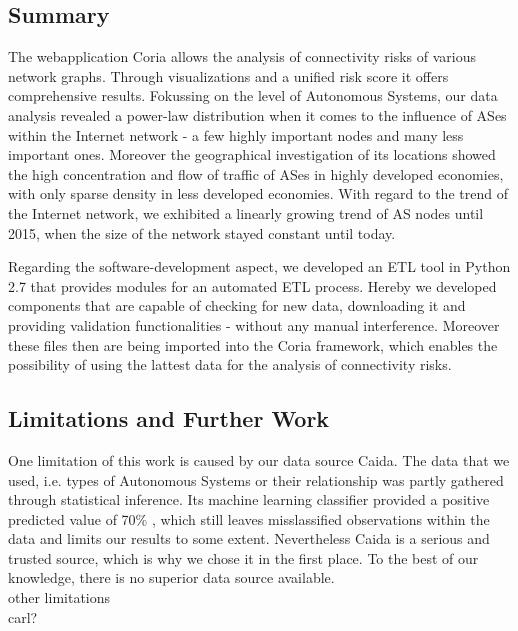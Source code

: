 \documentclass[conference, 11pt]{IEEEtran}
\begin{document}
\subsection{Summary}

The webapplication Coria allows the analysis of connectivity risks of various network graphs. Through visualizations and a unified risk score it offers comprehensive results. Fokussing on the level of Autonomous Systems, our data analysis revealed a power-law distribution when it comes to the influence of ASes within the Internet network - a few highly important nodes and many less important ones. Moreover the geographical investigation of its locations showed the high concentration and flow of traffic of ASes in highly developed economies, with only sparse density in less developed economies. With regard to the trend of the Internet network, we exhibited a linearly growing trend of AS nodes until 2015, when the size of the network stayed constant until today.

Regarding the software-development aspect, we developed an ETL tool in Python 2.7 that provides modules for an automated ETL process. Hereby we developed components that are capable of checking for new data, downloading it and providing validation functionalities - without any manual interference. Moreover these files then are being imported into the Coria framework, which enables the possibility of using the lattest data for the analysis of connectivity risks. \\
 

\subsection{Limitations and Further Work}
One limitation of this work is caused by our data source Caida. The data that we used, i.e. types of Autonomous Systems or their relationship was partly gathered through statistical inference. Its machine learning classifier provided a positive predicted value of 70\% \cite{Classification}, which still leaves misslassified observations within the data and limits our results to some extent. Nevertheless Caida is a serious and trusted source, which is why we chose it in the first place. To the best of our knowledge, there is no superior data source available.  \\ 

other limitations\\ 
carl? \\
\end{document}
